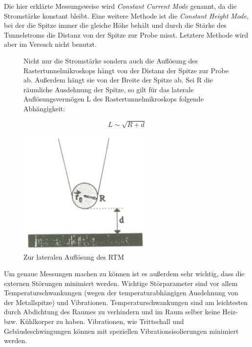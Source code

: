 Die hier erklärte Messungsweise wird \emph{Constant Current Mode} genannt, da die Stromstärke konstant bleibt. Eine weitere Methode ist die \emph{Constant Height Mode}, bei der die Spitze immer die gleiche Höhe behält und durch die Stärke des Tunnelstroms die Distanz von der Spitze zur Probe misst. Letztere Methode wird aber im Versuch nicht benutzt.

\begin{figure}[H]
\begin{minipage}{0.5\textwidth}
Nicht nur die Stromstärke sondern auch die Auflösung des Rastertunnelmikroskops hängt von der Distanz der Spitze zur Probe ab. Außerdem hängt sie von der Breite der Spitze ab. Sei R die räumliche Ausdehnung der Spitze, so gilt für das laterale Auflösungsvermögen L des Rastertunnelmikroskops folgende Abhängigkeit:

$$ L \sim \sqrt{R+d} $$

\end{minipage}
\begin{minipage}{0.5\textwidth}
	\includegraphics[width=0.6\textwidth]{Bilder/auflsg.png}
	\centering \caption{Zur lateralen Auflösung des RTM}
\end{minipage}
\end{figure}

Um genaue Messungen machen zu können ist es außerdem sehr wichtig, dass die externen Störungen minimiert werden. Wichtige Störparameter sind vor allem Temperaturschwankungen (wegen der temperaturabhängigen Ausdehnung von der Metallspitze) und Vibrationen. Temperaturschwankungen sind am leichtesten durch Abdichtung des Raumes zu verhindern und im Raum selber keine Heiz- bzw. Kühlkorper zu haben. Vibrationen, wie Trittschall und Gebäudeschwingungen können mit speziellen Vibrationsisolierungen minimiert werden. 

\clearpage
































